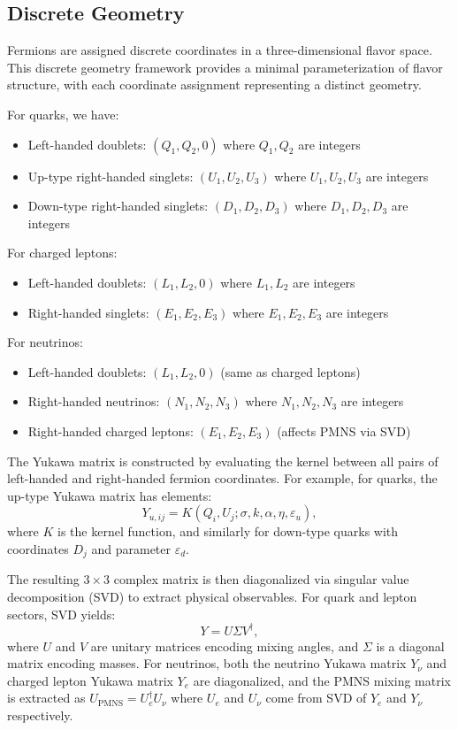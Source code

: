 \documentclass[12pt,a4paper]{article}
\begin{document}
\subsection{Discrete Geometry}

Fermions are assigned discrete coordinates in a three-dimensional flavor space. This discrete geometry framework provides a minimal parameterization of flavor structure, with each coordinate assignment representing a distinct geometry.

For quarks, we have:
\begin{itemize}
\item Left-handed doublets: $(Q_1, Q_2, 0)$ where $Q_1, Q_2$ are integers
\item Up-type right-handed singlets: $(U_1, U_2, U_3)$ where $U_1, U_2, U_3$ are integers
\item Down-type right-handed singlets: $(D_1, D_2, D_3)$ where $D_1, D_2, D_3$ are integers
\end{itemize}

For charged leptons:
\begin{itemize}
\item Left-handed doublets: $(L_1, L_2, 0)$ where $L_1, L_2$ are integers
\item Right-handed singlets: $(E_1, E_2, E_3)$ where $E_1, E_2, E_3$ are integers
\end{itemize}

For neutrinos:
\begin{itemize}
\item Left-handed doublets: $(L_1, L_2, 0)$ (same as charged leptons)
\item Right-handed neutrinos: $(N_1, N_2, N_3)$ where $N_1, N_2, N_3$ are integers
\item Right-handed charged leptons: $(E_1, E_2, E_3)$ (affects PMNS via SVD)
\end{itemize}

The Yukawa matrix is constructed by evaluating the kernel between all pairs of left-handed and right-handed fermion coordinates. For example, for quarks, the up-type Yukawa matrix has elements:
\begin{equation}
Y_{u,ij} = K(Q_i, U_j; \sigma, k, \alpha, \eta, \varepsilon_u),
\end{equation}
where $K$ is the kernel function, and similarly for down-type quarks with coordinates $D_j$ and parameter $\varepsilon_d$.

The resulting $3 \times 3$ complex matrix is then diagonalized via singular value decomposition (SVD) to extract physical observables. For quark and lepton sectors, SVD yields:
\begin{equation}
Y = U \Sigma V^\dagger,
\end{equation}
where $U$ and $V$ are unitary matrices encoding mixing angles, and $\Sigma$ is a diagonal matrix encoding masses. For neutrinos, both the neutrino Yukawa matrix $Y_\nu$ and charged lepton Yukawa matrix $Y_e$ are diagonalized, and the PMNS mixing matrix is extracted as $U_{\text{PMNS}} = U_e^\dagger U_\nu$ where $U_e$ and $U_\nu$ come from SVD of $Y_e$ and $Y_\nu$ respectively.
\end{document}
